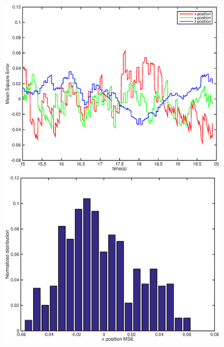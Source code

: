 \documentclass[letter, 10pt]{article}
\begin{document}
\begin{onehalfspacing}
\begin{figure}[h]
	\centering
	\begin{minipage}{.5\textwidth} 
  		\centering
    		\includegraphics[width=0.8\linewidth]{MSE_t.eps}
	\end{minipage}%
	\begin{minipage}{.5\textwidth} 
		\centering
    		\includegraphics[width=0.8\linewidth]{MSE_x.eps}
	\end{minipage}


\end{figure}
\end{onehalfspacing}
\end{document}
